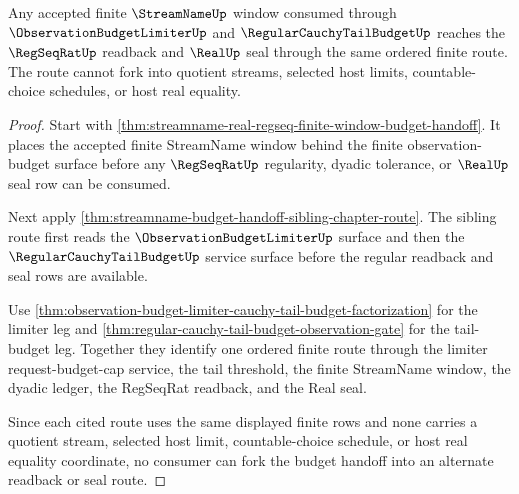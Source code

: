 \begin{theorem}
\label{thm:streamname-budget-regseq-real-route-coherence}
Any accepted finite $\StreamNameUp$ window consumed through $\ObservationBudgetLimiterUp$ and $\RegularCauchyTailBudgetUp$ reaches the $\RegSeqRatUp$ readback and $\RealUp$ seal through the same ordered finite route. The route cannot fork into quotient streams, selected host limits, countable-choice schedules, or host real equality.
\end{theorem}
\begin{proof}
Start with \autoref{thm:streamname-real-regseq-finite-window-budget-handoff}. It places the accepted finite StreamName window behind the finite observation-budget surface before any $\RegSeqRatUp$ regularity, dyadic tolerance, or $\RealUp$ seal row can be consumed.

Next apply \autoref{thm:streamname-budget-handoff-sibling-chapter-route}. The sibling route first reads the $\ObservationBudgetLimiterUp$ surface and then the $\RegularCauchyTailBudgetUp$ service surface before the regular readback and seal rows are available.

Use \autoref{thm:observation-budget-limiter-cauchy-tail-budget-factorization} for the limiter leg and \autoref{thm:regular-cauchy-tail-budget-observation-gate} for the tail-budget leg. Together they identify one ordered finite route through the limiter request-budget-cap service, the tail threshold, the finite StreamName window, the dyadic ledger, the RegSeqRat readback, and the Real seal.

Since each cited route uses the same displayed finite rows and none carries a quotient stream, selected host limit, countable-choice schedule, or host real equality coordinate, no consumer can fork the budget handoff into an alternate readback or seal route.
\end{proof}

